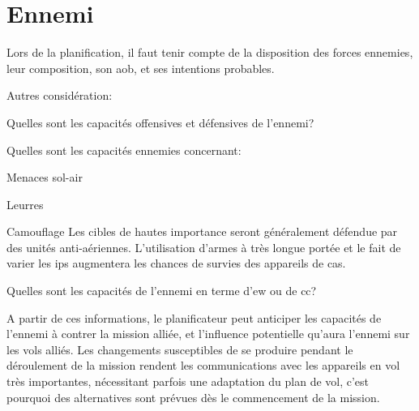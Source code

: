 \newpage
\section{Ennemi}

Lors de la planification, il faut tenir compte de la disposition des forces ennemies, leur composition, son \gls{aob}, et ses intentions probables.

\e
	\item Autres considération:
	\ee
		\item Quelles sont les capacités offensives et défensives de l'ennemi?
		\item Quelles sont les capacités ennemies concernant:
		\eee
			\item Menaces sol-air
			\item Leurres
			\item Camouflage
		\ed
		Les cibles de hautes importance seront généralement défendue par des unités anti-aériennes. L'utilisation d'armes à très longue portée et le fait de varier les \glspl{ip} augmentera les chances de survies des appareils de \gls{cas}.
		\item Quelles sont les capacités de l'ennemi en terme d'\gls{ew} ou de \gls{cc}?
	\ed
	\item A partir de ces informations, le planificateur peut anticiper les capacités de l'ennemi à contrer la mission alliée, et l'influence potentielle qu'aura l'ennemi sur les vols alliés. Les changements susceptibles de se produire pendant le déroulement de la mission rendent les communications avec les appareils en vol très importantes, nécessitant parfois une adaptation du plan de vol, c'est pourquoi des alternatives sont prévues dès le commencement de la mission.
\ed